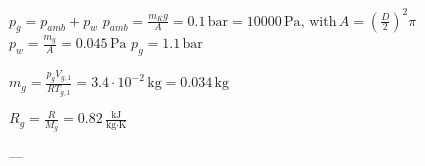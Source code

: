 \( p_g = p_{amb} + p_w \)  
\( p_{amb} = \frac{m_K g}{A} = 0.1 \, \text{bar} = 10000 \, \text{Pa}, \, \text{with} \, A = \left(\frac{D}{2}\right)^2 \pi \)  
\( p_w = \frac{m_g}{A} = 0.045 \, \text{Pa} \)  
\( p_g = 1.1 \, \text{bar} \)  

\( m_g = \frac{p_g V_{g,1}}{R T_{g,1}} = 3.4 \cdot 10^{-2} \, \text{kg} = 0.034 \, \text{kg} \)  

\( R_g = \frac{R}{M_g} = 0.82 \, \frac{\text{kJ}}{\text{kg·K}} \)  

---